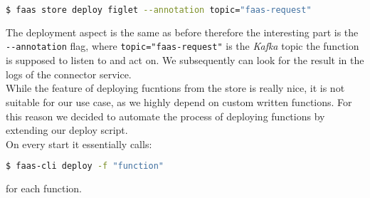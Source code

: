 \documentclass{article}
\begin{document}
  \begin{lstlisting}[language=bash]
    $ faas store deploy figlet --annotation topic="faas-request"
  \end{lstlisting}

  The deployment aspect is the same as before therefore the interesting part is the \texttt{-{}-annotation} flag, where \texttt{topic="faas-request"} is the \textit{Kafka} topic the function is supposed to listen to and act on. We subsequently can look for the result in the logs of the connector service. \\
  While the feature of deploying fucntions from the store is really nice, it is not suitable for our use case, as we highly depend on custom written functions. For this reason we decided to automate the process of deploying functions by extending our deploy script. \\

  On every start it essentially calls:

  \begin{lstlisting}[language=bash]
    $ faas-cli deploy -f "function"
  \end{lstlisting}

  for each function.
\end{document}
